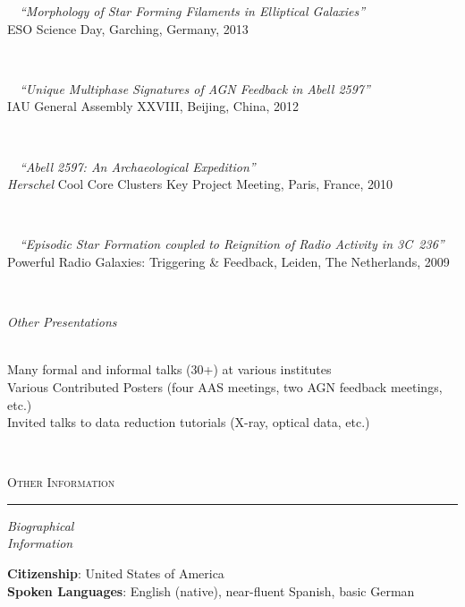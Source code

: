 \documentclass[11pt]{article}
\makeatletter
\def\vhrulefill#1{\leavevmode\leaders\hrule\@height#1\hfill \kern\z@}
\makeatother
\begin{document}
\hspace{42mm} \parbox{5.15in}{
\textbullet~~\textit{``Morphology of Star Forming Filaments in Elliptical Galaxies''} \\ ESO Science Day, Garching, Germany, 2013}\\

\hspace{42mm} \parbox{5.15in}{
\textbullet~~\textit{``Unique Multiphase Signatures of AGN Feedback in Abell 2597''} \\ IAU General Assembly XXVIII, Beijing, China, 2012 } \\

\hspace{42mm} \parbox{5.15in}{
\textbullet~~\textit{``Abell 2597: An Archaeological Expedition''} \\ \textit{Herschel} Cool Core Clusters Key Project Meeting, Paris, France, 2010 } \\

\hspace{42mm} \parbox{5.15in}{
\textbullet~~\textit{``Episodic Star Formation coupled to Reignition of Radio Activity in 3C~236''} \\
Powerful Radio Galaxies: Triggering \& Feedback, Leiden, The Netherlands, 2009 } \\


\vspace{4mm}

\hspace{2.5mm} \parbox{1.5in}{\textit{Other Presentations \\\\}} \parbox{5.15in}{
Many formal and informal talks (30+) at various institutes\\
Various Contributed Posters (four AAS meetings, two AGN feedback meetings, etc.)\\
Invited talks to data reduction tutorials (X-ray, optical data, etc.)
}\\


\vspace{4mm}

\textsc{Other Information} \vhrulefill{0.4pt}

\vspace{4mm}


\hspace{2.5mm} \parbox{1.5in}{\textit{Biographical \\ Information  }} \parbox{5.15in}{
\textbf{Citizenship}: United States of America\\
\textbf{Spoken Languages}: English (native), near-fluent Spanish, basic German}\\
\end{document}
